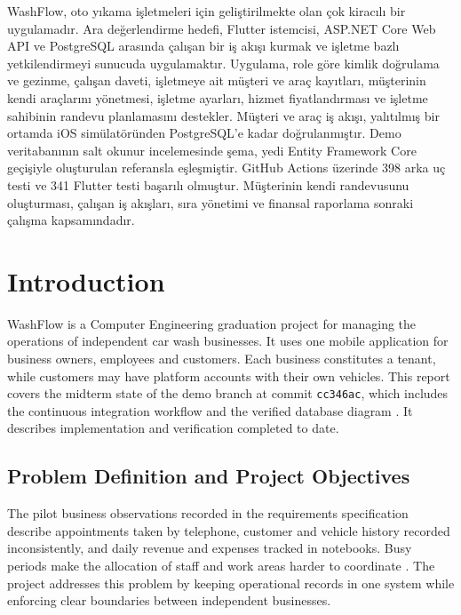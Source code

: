 \documentclass[12pt]{report}
\begin{document}
\begin{preliminary}
\begin{ozet}
WashFlow, oto yıkama işletmeleri için geliştirilmekte olan çok kiracılı bir uygulamadır. Ara değerlendirme hedefi, Flutter istemcisi, ASP.NET Core Web API ve PostgreSQL arasında çalışan bir iş akışı kurmak ve işletme bazlı yetkilendirmeyi sunucuda uygulamaktır. Uygulama, role göre kimlik doğrulama ve gezinme, çalışan daveti, işletmeye ait müşteri ve araç kayıtları, müşterinin kendi araçlarını yönetmesi, işletme ayarları, hizmet fiyatlandırması ve işletme sahibinin randevu planlamasını destekler. Müşteri ve araç iş akışı, yalıtılmış bir ortamda iOS simülatöründen PostgreSQL'e kadar doğrulanmıştır. Demo veritabanının salt okunur incelemesinde şema, yedi Entity Framework Core geçişiyle oluşturulan referansla eşleşmiştir. GitHub Actions üzerinde 398 arka uç testi ve 341 Flutter testi başarılı olmuştur. Müşterinin kendi randevusunu oluşturması, çalışan iş akışları, sıra yönetimi ve finansal raporlama sonraki çalışma kapsamındadır.
\end{ozet}

\tableofcontents
\listoffigures
{}
\listoftables
{}
\end{preliminary}

\chapter{Introduction}
WashFlow is a Computer Engineering graduation project for managing the operations of independent car wash businesses. It uses one mobile application for business owners, employees and customers. Each business constitutes a tenant, while customers may have platform accounts with their own vehicles. This report covers the midterm state of the demo branch at commit \texttt{cc346ac}, which includes the continuous integration workflow and the verified database diagram \cite{repo,ciPR,erdPR}. It describes implementation and verification completed to date.

\section{Problem Definition and Project Objectives}
The pilot business observations recorded in the requirements specification describe appointments taken by telephone, customer and vehicle history recorded inconsistently, and daily revenue and expenses tracked in notebooks. Busy periods make the allocation of staff and work areas harder to coordinate \cite{srs}. The project addresses this problem by keeping operational records in one system while enforcing clear boundaries between independent businesses.
\end{document}
